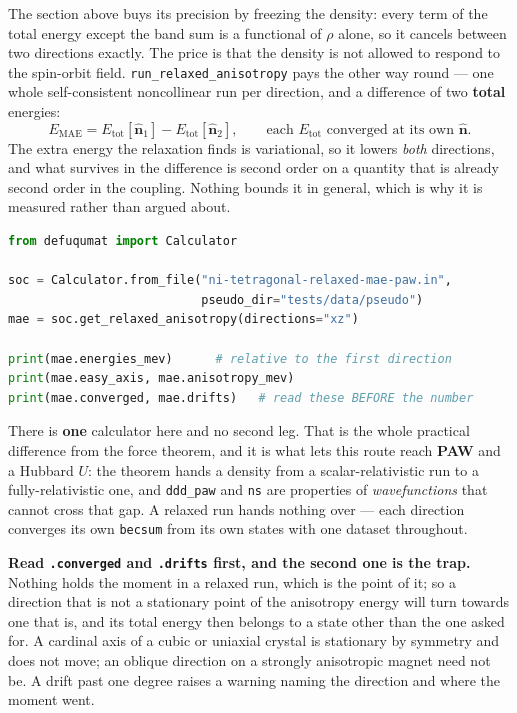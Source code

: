 \documentclass[11pt,a4paper]{article}
\newcommand{\code}[1]{\texttt{\small #1}}
\begin{document}
The section above buys its precision by freezing the density: every term of the
total energy except the band sum is a functional of $\rho$ alone, so it cancels
between two directions exactly. The price is that the density is not allowed to
respond to the spin-orbit field. \code{run\_relaxed\_anisotropy} pays the other
way round --- one whole self-consistent noncollinear run per direction, and a
difference of two \textbf{total} energies:
%
\[
  E_{\mathrm{MAE}} = E_{\mathrm{tot}}[\hat{\mathbf n}_1] - E_{\mathrm{tot}}[\hat{\mathbf n}_2],
  \qquad \text{each } E_{\mathrm{tot}} \text{ converged at its own } \hat{\mathbf n}.
\]
%
The extra energy the relaxation finds is variational, so it lowers \emph{both}
directions, and what survives in the difference is second order on a quantity
that is already second order in the coupling. Nothing bounds it in general,
which is why it is measured rather than argued about.

\begin{lstlisting}[language=Python]
from defuqumat import Calculator

soc = Calculator.from_file("ni-tetragonal-relaxed-mae-paw.in",
                           pseudo_dir="tests/data/pseudo")
mae = soc.get_relaxed_anisotropy(directions="xz")

print(mae.energies_mev)      # relative to the first direction
print(mae.easy_axis, mae.anisotropy_mev)
print(mae.converged, mae.drifts)   # read these BEFORE the number
\end{lstlisting}

There is \textbf{one} calculator here and no second leg. That is the whole
practical difference from the force theorem, and it is what lets this route
reach \textbf{PAW} and a Hubbard $U$: the theorem hands a density from a
scalar-relativistic run to a fully-relativistic one, and \code{ddd\_paw} and
\code{ns} are properties of \emph{wavefunctions} that cannot cross that gap. A
relaxed run hands nothing over --- each direction converges its own
\code{becsum} from its own states with one dataset throughout.

\textbf{Read \code{.converged} and \code{.drifts} first, and the second one is
the trap.} Nothing holds the moment in a relaxed run, which is the point of it;
so a direction that is not a stationary point of the anisotropy energy will turn
towards one that is, and its total energy then belongs to a state other than the
one asked for. A cardinal axis of a cubic or uniaxial crystal is stationary by
symmetry and does not move; an oblique direction on a strongly anisotropic
magnet need not be. A drift past one degree raises a warning naming the
direction and where the moment went.
\end{document}
